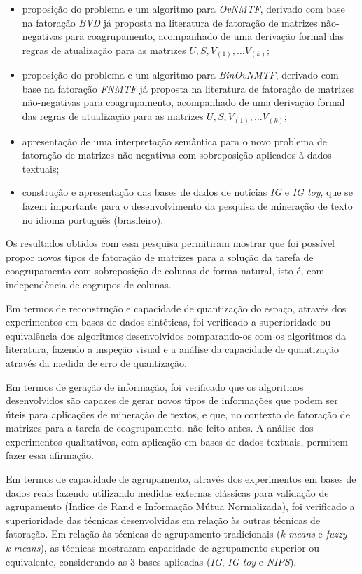 \documentclass[
    12pt,                %
    oneside,            %
    a4paper,            %
    english,            %
    brazil                %
    ]{abntex2ppgsi}
\begin{document}
\begin{itemize}
    \item proposição do problema e um algoritmo para \textit{OvNMTF}, derivado com base na fatoração \textit{BVD} já proposta na literatura de fatoração de matrizes não-negativas para coagrupamento, acompanhado de uma derivação formal das regras de atualização para as matrizes $U, S, V_{(1)}, \dots V_{(k)}$;
    \item proposição do problema e um algoritmo para \textit{BinOvNMTF}, derivado com base na fatoração \textit{FNMTF} já proposta na literatura de fatoração de matrizes não-negativas para coagrupamento, acompanhado de uma derivação formal das regras de atualização para as matrizes $U, S, V_{(1)}, \dots V_{(k)}$;
    \item apresentação de uma interpretação semântica para o novo problema de fatoração de matrizes não-negativas com sobreposição aplicados à dados textuais;
    \item construção e apresentação das bases de dados de notícias \textit{IG} e \textit{IG toy}, que se fazem importante para o desenvolvimento da pesquisa de mineração de texto no idioma português (brasileiro).
\end{itemize}

Os resultados obtidos com essa pesquisa permitiram mostrar que foi possível propor novos tipos de fatoração de matrizes para a solução da tarefa de coagrupamento com sobreposição de colunas de forma natural, isto é, com independência de cogrupos de colunas.

Em termos de reconstrução e capacidade de quantização do espaço, através dos experimentos em bases de dados sintéticas, foi verificado a superioridade ou equivalência dos algoritmos desenvolvidos comparando-os com os algoritmos da literatura, fazendo a inspeção visual e a análise da capacidade de quantização através da medida de erro de quantização.

Em termos de geração de informação, foi verificado que os algoritmos desenvolvidos são capazes de gerar novos tipos de informações que podem ser úteis para aplicações de mineração de textos, e que, no contexto de fatoração de matrizes para a tarefa de coagrupamento, não feito antes.
A análise dos experimentos qualitativos, com aplicação em bases de dados textuais, permitem fazer essa afirmação.

Em termos de capacidade de agrupamento, através dos experimentos em bases de dados reais fazendo utilizando medidas externas clássicas para validação de agrupamento (Índice de Rand e Informação Mútua Normalizada), foi verificado a superioridade das técnicas desenvolvidas em relação às outras técnicas de fatoração.
Em relação às técnicas de agrupamento tradicionais (\textit{k-means} e \textit{fuzzy k-means}), as técnicas mostraram capacidade de agrupamento superior ou equivalente, considerando as $3$ bases aplicadas (\textit{IG}, \textit{IG toy} e \textit{NIPS}).
\end{document}
